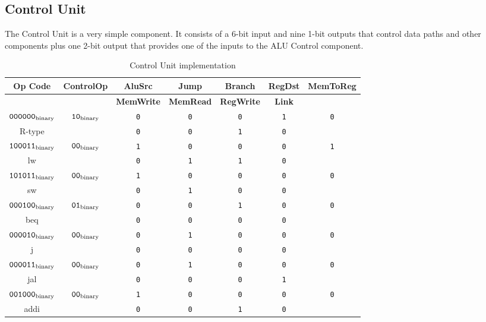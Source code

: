 \documentclass[]{spie}
\begin{document}
\subsection{Control Unit}
The Control Unit is a very simple component. It consists of a 6-bit input and nine 1-bit outputs that
control data paths and other components plus one 2-bit output that provides one of the inputs to the ALU Control component.

\begin{table}[H]
	\begin{center}
	\begin{tabular}{|c|c|c|c|c|c|c|}
		\hline
		\rowcolor[gray]{.9} {\bf Op Code} & {\bf ControlOp} & {\bf AluSrc} & {\bf Jump} & {\bf Branch}  & {\bf RegDst} & {\bf MemToReg} \\[6pt]
		\hline
		\rowcolor[gray]{.9}  { } &        &{ \bf MemWrite } & {\bf MemRead}& {\bf RegWrite}& {\bf Link} & { } \\[6pt]
		\hline
					${\tt 000000_{\rm binary}}$ & ${\tt 10_{\rm binary}}$ &{\tt 0}&{\tt 0}&{\tt 0}&{\tt 1}&{\tt 0}\\
		                             R-type  &          &{\tt 0}&{\tt 0}&{\tt 1}&{\tt 0}&       \\
		\hline
		                        ${\tt 100011_{\rm binary}}$ & ${\tt 00_{\rm binary}}$ &{\tt 1}&{\tt 0}&{\tt 0}&{\tt 0}&{\tt 1}\\
		                          lw   &          &{\tt 0}&{\tt 1}&{\tt 1}&{\tt 0}&       \\
		\hline
					${\tt 101011_{\rm binary}}$ & ${\tt 00_{\rm binary}}$ &{\tt 1}&{\tt 0}&{\tt 0}&{\tt 0}&{\tt 0}\\
		                          sw         &          &{\tt 0}&{\tt 1}&{\tt 0}&{\tt 0}&       \\
		\hline
					${\tt 000100_{\rm binary}}$ & ${\tt 01_{\rm binary}}$ &{\tt 0}&{\tt 0}&{\tt 1}&{\tt 0}&{\tt 0}\\
		                           beq       &          &{\tt 0}&{\tt 0}&{\tt 0}&{\tt 0}&       \\
		\hline
					${\tt 000010_{\rm binary}}$ & ${\tt 00_{\rm binary}}$ &{\tt 0}&{\tt 1}&{\tt 0}&{\tt 0}&{\tt 0}\\
		                           j         &          &{\tt 0}&{\tt 0}&{\tt 0}&{\tt 0}&       \\
		\hline
					${\tt 000011_{\rm binary}}$ & ${\tt 00_{\rm binary}}$ &{\tt 0}&{\tt 1}&{\tt 0}&{\tt 0}&{\tt 0}\\
		                            jal      &          &{\tt 0}&{\tt 0}&{\tt 0}&{\tt 1}&       \\
		\hline
					${\tt 001000}_{\rm binary}$ & ${\tt 00_{\rm binary}}$ &{\tt 1}&{\tt 0}&{\tt 0}&{\tt 0}&{\tt 0}\\
		                             addi    &          &{\tt 0}&{\tt 0}&{\tt 1}&{\tt 0}&       \\
		\hline
	\end{tabular}
	\end {center}
	\caption{\label{tab:ControlUnit} Control Unit implementation}
\end{table}
\end{document}
